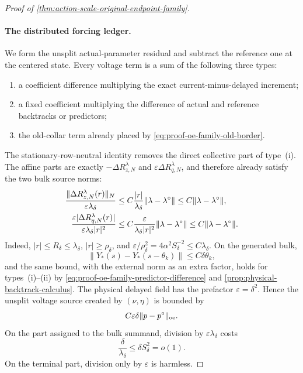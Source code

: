 \begin{proof}[Proof of
\cref{thm:action-scale-original-endpoint-family}]
\paragraph{The distributed forcing ledger.}
We form the unsplit actual-parameter residual and subtract the reference
one at the centered state.  Every voltage term is a sum of the following
three types:
\begin{enumerate}[label=\textup{(\roman*)},leftmargin=2em]
\item a coefficient difference multiplying the exact current-minus-delayed
      increment;
\item a fixed coefficient multiplying the difference of actual and
      reference backtracks or predictors;
\item the old-collar term already placed by
      \cref{eq:proof-oe-family-old-border}.
\end{enumerate}
The stationary-row-neutral identity removes the direct collective part of
type~\textup{(i)}.  The affine parts are exactly
\(-\Delta R_{z,N}^{\lambda}\) and
\(\varepsilon\Delta R_{q,N}^{\lambda}\), and therefore already satisfy
the two bulk source norms:
\begin{align}
 \frac{\|\Delta R_{z,N}^{\lambda}(r)\|_N}
       {\varepsilon\lambda_\delta}
 &\le C\frac{|r|}{\lambda_\delta}
       \|\lambda-\lambda^\circ\|
 \le C\|\lambda-\lambda^\circ\|,\notag\\
 \frac{\varepsilon|\Delta R_{q,N}^{\lambda}(r)|}
       {\varepsilon\lambda_\delta|r|^2}
 &\le C\frac{\varepsilon}{\lambda_\delta|r|^2}
       \|\lambda-\lambda^\circ\|
 \le C\|\lambda-\lambda^\circ\|.                \label{eq:proof-oe-family-affine-source-norms}
\end{align}
Indeed, \(|r|\le R_\delta\le\lambda_\delta\),
\(|r|\ge\rho_\delta\), and
\(\varepsilon/\rho_\delta^2=4\alpha^2S_\delta^{-2}
\le C\lambda_\delta\).
On the generated bulk,
\begin{equation}
 \|Y_*(s)-Y_*(s-\theta_k)\|
 \le C\delta\theta_k,                            \label{eq:proof-oe-family-generated-delay-difference}
\end{equation}
and the same bound, with the external norm as an extra factor, holds for
types~\textup{(i)}--\textup{(ii)} by
\cref{eq:proof-oe-family-predictor-difference} and
\cref{prop:physical-backtrack-calculus}.  The physical delayed field has
the prefactor \(\varepsilon=\delta^2\).  Hence the unsplit voltage source
created by \((\nu,\eta)\) is bounded by
\begin{equation}
 C\varepsilon\delta\|p-p^\circ\|_{\rm oe}.       \label{eq:proof-oe-family-voltage-source-size}
\end{equation}
On the part assigned to the bulk summand, division by
\(\varepsilon\lambda_\delta\) costs
\[
 \frac{\delta}{\lambda_\delta}
 \le\delta S_\delta^2=o(1).
\]
On the terminal part, division only by \(\varepsilon\) is harmless.


\end{proof}
